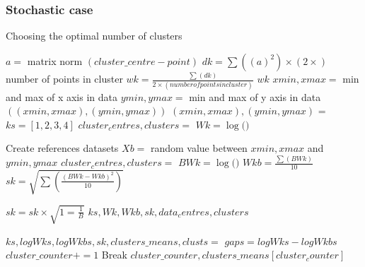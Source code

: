 \subsubsection{Stochastic case}
\begin{algorithm}
\caption{Choosing the optimal number of clusters}
 \begin{algorithmic}[1]
    \Statex
    
    			\State $a = $ matrix norm $(cluster\_centre - point)$    			
    		\EndFor
    		\State $dk = \sum((a)^2 )\times (2 \times )$ number of points in cluster
    	\EndFor
    	\State $wk = \frac{ \sum(dk)}{2 \times (number of points in cluster)} $
    	\State \Return $wk$
    \EndFunction
    \Statex  
    	\State $xmin, xmax = $ min and max of x axis in data
    	\State $ymin, ymax = $ min and max of y axis in data
    	\State \Return $((xmin, xmax), (ymin, ymax)) $
    \EndFunction
    \Statex
    	$(xmin, xmax), (ymin, ymax)$ = %
    	\State $ks = [1,2,3,4]$
   			\State $cluster_centres, clusters = $ 
   			\State $Wk = \log($$)$
   			
   			\State Create references datasets
   					\State $Xb = $ random value between $xmin, xmax$ and $ymin, ymax$
   				\EndFor
				\State $cluster_centres, clusters = $ 
  				\State $BWk = \log($$)$
   			\EndFor   
   			\State $Wkb = \frac{\sum(BWk)}{10} $	
   			\State $sk = \sqrt{\sum(\frac{(BWk - Wkb)^2}{10})}$	
   				
    	\EndFor
    	\State $sk = sk \times \sqrt{1=\frac{1}{B}}$
    	\State \Return $ks, Wk, Wkb, sk, data_centres, clusters$
    \EndFunction
    
    \Statex
		    \State $ks, logWks, logWkbs, sk, clusters\_means, clusts = $
		    	\State $gaps = logWks - logWkbs$
		    \EndFor
		    	\State $cluster\_counter += 1$ 
		    	\EndIf
		    		\State Break 
		    	\EndIf
		    \EndFor
	\State \Return $cluster\_counter, clusters\_means[cluster_counter]$
	\EndFunction


  \end{algorithmic}
\end{algorithm}

